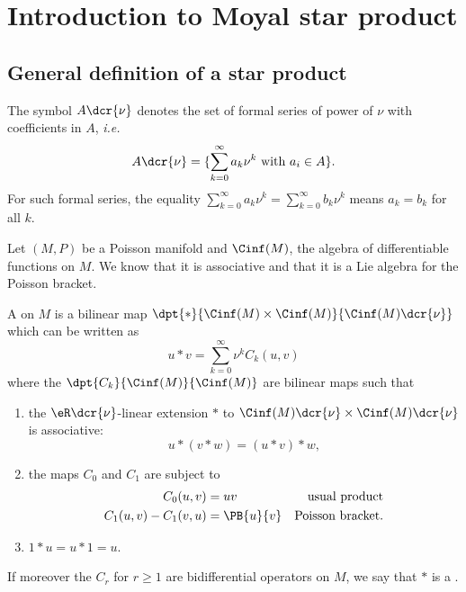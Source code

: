 \section{Introduction to Moyal star product}\label{app:Moyal}

\subsection{General definition of a star product}

The symbol $A\dcr{\nu}$ denotes the set of formal series of power of $\nu$ with coefficients in $A$, \textit{i.e.}
\[
	A\dcr{\nu}=\{\sum_{k=0}^{\infty}a_k\nu^k\text{ with } a_i\in A\}.
\]
For such formal series, the equality $\sum_{k=0}^{\infty}a_k\nu^k=\sum_{k=0}^{\infty}b_k\nu^k$ means $a_k=b_k$ for all $k$.

Let $(M,P)$ be a Poisson manifold and $\Cinf(M)$, the algebra of differentiable functions on $M$. We know that it is associative and that it is a Lie algebra for the Poisson bracket.


\begin{definition}
	A  on $M$ is a bilinear map $\dpt{\ast}{\Cinf(M)\times\Cinf(M)}{\Cinf(M)\dcr{\nu}}$ which can be written as
	\begin{equation}
		u\ast v=\sum_{k=0}^{\infty}\nu^kC_k(u,v)
	\end{equation}
	where the $\dpt{C_k}{\Cinf(M)}{\Cinf(M)}$ are bilinear maps such that
	\renewcommand{\labelenumi}{(\roman{enumi})}
	\begin{enumerate}
		\item the $\eR\dcr{\nu}$-linear extension $\ast$ to $\Cinf(M)\dcr{\nu}\times\Cinf(M)\dcr{\nu}$ is associative:
		      \begin{equation}
			      u\ast(v\ast w)=(u\ast v)\ast w,
		      \end{equation}


		\item the maps $C_0$ and $C_1$ are subject to
		      \begin{equation}
			      \begin{aligned}
				      C_0(u,v)          & =uv        & \text{usual product}    \\
				      C_1(u,v)-C_1(v,u) & =\PB{u}{v} & \text{Poisson bracket}.
			      \end{aligned}
		      \end{equation}

		\item $1\ast u=u\ast 1=u$.
	\end{enumerate}
	If moreover the $C_r$ for $r\ge 1$ are bidifferential operators on $M$, we say that $\ast$ is a .

\end{definition}

